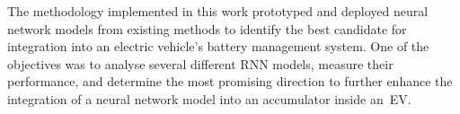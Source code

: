 %
The methodology implemented in this work prototyped and deployed neural network models from existing methods to identify the best candidate for integration into an electric vehicle's battery management system.
One of the objectives was to analyse several different RNN models, measure their performance, and determine the most promising direction to further enhance the integration of a neural network model into an accumulator inside an~EV.
%

